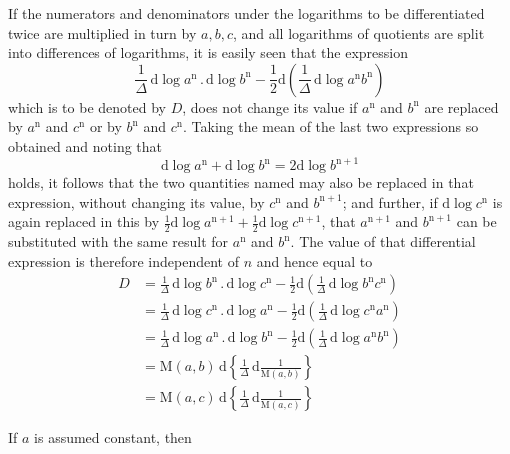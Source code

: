 If the numerators and denominators under the logarithms to be differentiated twice are multiplied in turn by $a,b,c$, and all logarithms of quotients are split into differences of logarithms, it is easily seen that the expression
\[
\frac{1}{\Delta}\,\mathrm d\log a^{\mathrm n}\mathbin{.}\mathrm d\log b^{\mathrm n}
-\frac12\mathrm d\left(\frac{1}{\Delta}\,\mathrm d\log a^{\mathrm n}b^{\mathrm n}\right)
\]
which is to be denoted by $D$, does not change its value if
$a^{\mathrm n}$ and $b^{\mathrm n}$ are replaced by $a^{\mathrm n}$ and $c^{\mathrm n}$ or by
$b^{\mathrm n}$ and $c^{\mathrm n}$. Taking the mean of the last two expressions so obtained and noting that
\[
\mathrm d\log a^{\mathrm n}+\mathrm d\log b^{\mathrm n}
=2\mathrm d\log b^{\mathrm n+1}
\]
holds, it follows that the two quantities named may also be replaced in that expression, without changing its value, by $c^{\mathrm n}$ and $b^{\mathrm n+1}$; and further, if $\mathrm d\log c^{\mathrm n}$ is again replaced in this by
$\frac12\mathrm d\log a^{\mathrm n+1}+\frac12\mathrm d\log c^{\mathrm n+1}$,
that $a^{\mathrm n+1}$ and $b^{\mathrm n+1}$ can be substituted with the same result for
$a^{\mathrm n}$ and $b^{\mathrm n}$. 
The value of that differential expression is therefore independent of $n$ and hence equal to
\[
\begin{aligned}
D&=\displaystyle\frac{1}{\Delta}\,\mathrm d\log b^{\mathrm n}\mathbin{.}\mathrm d\log c^{\mathrm n}
-\frac12\mathrm d\left(\frac{1}{\Delta}\,\mathrm d\log b^{\mathrm n}c^{\mathrm n}\right)\\[6pt]
&=\displaystyle\frac{1}{\Delta}\,\mathrm d\log c^{\mathrm n}\mathbin{.}\mathrm d\log a^{\mathrm n}
-\frac12\mathrm d\left(\frac{1}{\Delta}\,\mathrm d\log c^{\mathrm n}a^{\mathrm n}\right)\\[6pt]
&=\displaystyle\frac{1}{\Delta}\,\mathrm d\log a^{\mathrm n}\mathbin{.}\mathrm d\log b^{\mathrm n}
-\frac12\mathrm d\left(\frac{1}{\Delta}\,\mathrm d\log a^{\mathrm n}b^{\mathrm n}\right)\\[6pt]
&=\displaystyle\mathrm M(a,b)\,\mathrm d\left\{\frac{1}{\Delta}\,\mathrm d\frac{1}{\mathrm M(a,b)}\right\}\\&=\mathrm M(a,c)\,\mathrm d\left\{\frac{1}{\Delta}\,\mathrm d\frac{1}{\mathrm M(a,c)}\right\}
\end{aligned}
\]
\par If $a$ is assumed constant, then
